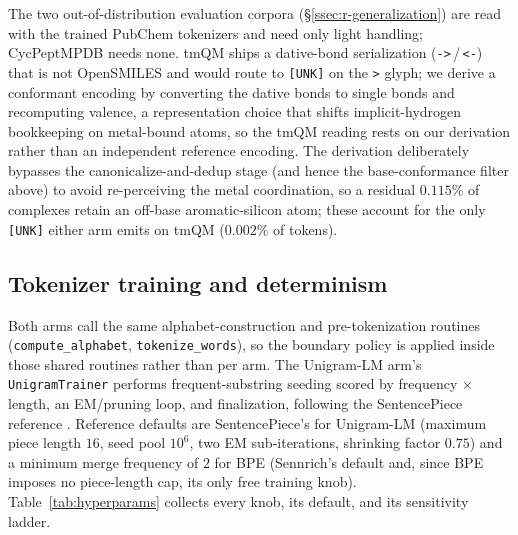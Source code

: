 \documentclass{article}
\begin{document}
The two out-of-distribution evaluation corpora
(\S\ref{ssec:r-generalization}) are read with the trained PubChem tokenizers and
need only light handling; CycPeptMPDB needs none. tmQM ships a dative-bond
serialization (\texttt{->}\,/\,\texttt{<-}) that is not OpenSMILES and would
route to \texttt{[UNK]} on the \texttt{>} glyph; we derive a conformant encoding
by converting the dative bonds to single bonds and recomputing valence, a
representation choice that shifts implicit-hydrogen bookkeeping on metal-bound
atoms, so the tmQM reading rests on our derivation rather than an independent
reference encoding. The derivation deliberately bypasses the
canonicalize-and-dedup stage (and hence the base-conformance filter above) to
avoid re-perceiving the metal coordination, so a residual $0.115\%$ of complexes
retain an off-base aromatic-silicon atom; these account for the only
\texttt{[UNK]} either arm emits on tmQM ($0.002\%$ of tokens).

\subsection{Tokenizer training and determinism}\label{app:training}

Both arms call the same alphabet-construction and pre-tokenization routines
(\texttt{compute\_alphabet}, \texttt{tokenize\_words}), so the boundary policy
is applied inside those shared routines rather than per arm. The Unigram-LM
arm's \texttt{UnigramTrainer} \citep{kudo2018subword-reg} performs
frequent-substring seeding scored by frequency $\times$ length, an EM/pruning
loop, and finalization, following the SentencePiece reference
\citep{kudo2018sentencepiece}. Reference defaults are SentencePiece's for
Unigram-LM (maximum piece length $16$, seed pool $10^6$, two EM
sub-iterations, shrinking factor $0.75$) and a minimum merge frequency of $2$
for BPE (Sennrich's default and, since BPE imposes no piece-length cap, its
only free training knob). Table~\ref{tab:hyperparams} collects every knob, its
default, and its sensitivity ladder.
\end{document}
